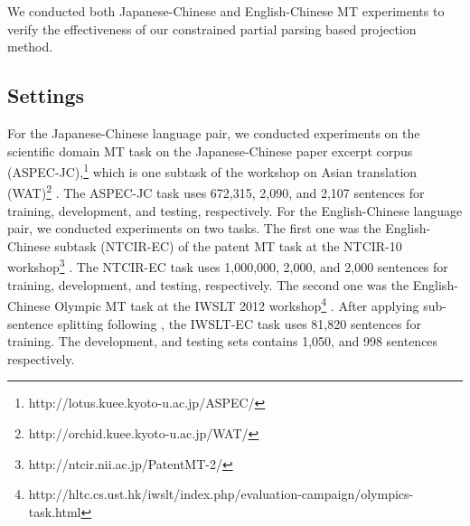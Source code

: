 \documentclass[english]{jnlp_1.4}
\begin{document}
We conducted both Japanese-Chinese and English-Chinese MT experiments to verify the effectiveness of 
our constrained partial parsing based projection method.


\subsection{Settings}

For the Japanese-Chinese language pair, we conducted experiments on the scientific domain MT task on the 
Japanese-Chinese paper excerpt corpus (ASPEC-JC),\footnote{http://lotus.kuee.kyoto-u.ac.jp/ASPEC/} which 
is one subtask of the workshop on Asian translation (WAT)\footnote{http://orchid.kuee.kyoto-u.ac.jp/WAT/} 
\cite{nakazawa-EtAl:2015:WAT}. The ASPEC-JC task uses 672,315, 2,090, and 2,107 sentences for training, 
development, and testing, respectively. For the English-Chinese language pair, we conducted experiments on
{two tasks. The first one was} the English-Chinese subtask (NTCIR-EC) of the patent MT task at 
the NTCIR-10 workshop\footnote{http://ntcir.nii.ac.jp/PatentMT-2/} 
\cite{conf-ntcir-GotoCLST13}. The NTCIR-EC task uses 1,000,000, 2,000, and 2,000 sentences for training, 
development, and testing, respectively. {The second one was the English-Chinese Olympic MT task at the 
IWSLT 2012 workshop\footnote{{http://hltc.cs.ust.hk/iwslt/index.php/evaluation-campaign/olympics-task.html}}
\cite{iwslt-overview:12}. After applying sub-sentence splitting following \cite{chu:2012:IWSLT},
the IWSLT-EC task uses 81,820 sentences for training. The development, and testing sets contains 1,050, and 998 sentences 
respectively.}
\end{document}
